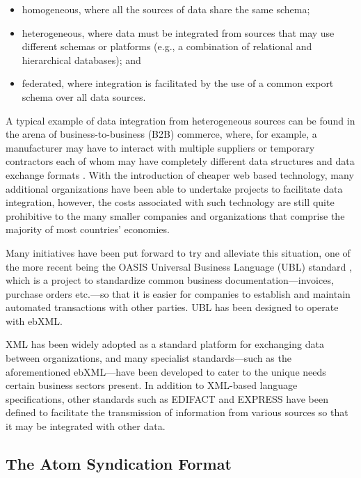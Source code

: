 \documentclass{CRPITStyle}
\begin{document}
\begin{itemize}

	\item homogeneous, where all the sources of data share the same
	schema;

	\item heterogeneous, where data must be integrated from sources that
	may use different schemas or platforms (e.g., a combination of
	relational and hierarchical databases); and

	\item federated, where integration is facilitated by the use of a
	common export schema over all data sources.

\end{itemize}

A typical example of data integration from heterogeneous sources can be
found in the arena of business-to-business (B2B) commerce, where, for
example, a manufacturer may have to interact with multiple suppliers or
temporary contractors each of whom may have completely different data
structures and data exchange formats \cite{Ston-M-2001-SIGMOD}. With the
introduction of cheaper web based technology, many additional
organizations have been able to undertake projects to facilitate data
integration, however, the costs associated with such technology are
still quite prohibitive to the many smaller companies and organizations
that comprise the majority of most countries' economies.

Many initiatives have been put forward to try and alleviate this
situation, one of the more recent being the OASIS Universal Business
Language (UBL) standard \cite{Mead-B-2004-UBL}, which is a project to
standardize common business documentation---invoices, purchase orders
etc.---so that it is easier for companies to establish and maintain
automated transactions with other parties. UBL has been designed to
operate with ebXML.

XML has been widely adopted as a standard platform for exchanging data
between organizations, and many specialist standards---such as the
aforementioned ebXML---have been developed to cater to the unique needs
certain business sectors present. In addition to XML-based language
specifications, other standards such as EDIFACT  and EXPRESS have been
defined to facilitate the transmission of information from various
sources so that it may be integrated with other data.

\subsection{The Atom Syndication Format}
\end{document}
